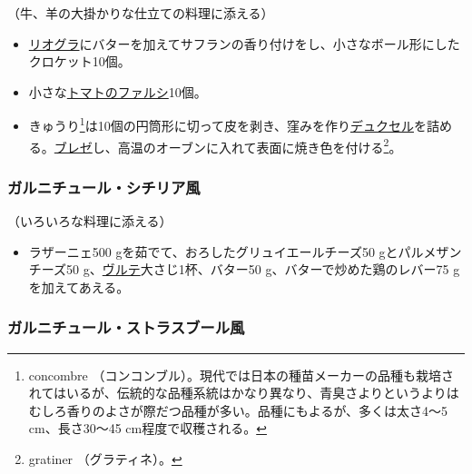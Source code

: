 \begin{recette}
（牛、羊の大掛かりな仕立ての料理に添える）

\begin{itemize}
\item
  \protect\hyperlink{riz-au-gras}{リオグラ}にバターを加えてサフランの香り付けをし、小さなボール形にしたクロケット10個。
\item
  小さな\protect\hyperlink{tomates-farcies}{トマトのファルシ}10個。
\item
  きゅうり\footnote{concombre
    （コンコンブル）。現代では日本の種苗メーカーの品種も栽培されてはいるが、伝統的な品種系統はかなり異なり、青臭さよりというよりはむしろ香りのよさが際だつ品種が多い。品種にもよるが、多くは太さ4〜5
    cm、長さ30〜45 cm程度で収穫される。}は10個の円筒形に切って皮を剥き、窪みを作り\protect\hyperlink{duxelles-seche}{デュクセル}を詰める。\protect\hyperlink{braisage-des-legumes}{ブレゼ}し、高温のオーブンに入れて表面に焼き色を付ける\footnote{gratiner
    （グラティネ）。}。
\end{itemize}

\atoaki{}

\hypertarget{garniture-sicilienne}{%
\subsubsection{ガルニチュール・シチリア風}\label{garniture-sicilienne}}



（いろいろな料理に添える）

\begin{itemize}
\tightlist
\item
  ラザーニェ500 gを茹でて、おろしたグリュイエールチーズ50
  gとパルメザンチーズ50
  g、\protect\hyperlink{veloute}{ヴルテ}大さじ1杯、バター50
  g、バターで炒めた鶏のレバー75 gを加えてあえる。
\end{itemize}

\atoaki{}

\hypertarget{garniture-strasbbourgeoise}{%
\subsubsection{ガルニチュール・ストラスブール風}\label{garniture-strasbbourgeoise}}


\end{recette}
